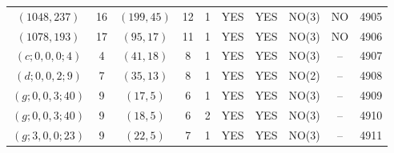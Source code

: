 \begin{longtable}{|c|c|c|c|c|c|c|c|c|c|}
$(1048, 237)$ & 16 & $(199, 45)$ & 12 & 1 & YES & YES & NO(3) & NO & 4905\\
$(1078, 193)$ & 17 & $(95, 17)$ & 11 & 1 & YES & YES & NO(3) & NO & 4906\\
$(c; 0, 0, 0; 4)$ & 4 & $(41, 18)$ & 8 & 1 & YES & YES & NO(3) & -- & 4907\\
$(d; 0, 0, 2; 9)$ & 7 & $(35, 13)$ & 8 & 1 & YES & YES & NO(2) & -- & 4908\\
$(g; 0, 0, 3; 40)$ & 9 & $(17, 5)$ & 6 & 1 & YES & YES & NO(3) & -- & 4909\\
$(g; 0, 0, 3; 40)$ & 9 & $(18, 5)$ & 6 & 2 & YES & YES & NO(3) & -- & 4910\\
$(g; 3, 0, 0; 23)$ & 9 & $(22, 5)$ & 7 & 1 & YES & YES & NO(3) & -- & 4911
\end{longtable}
